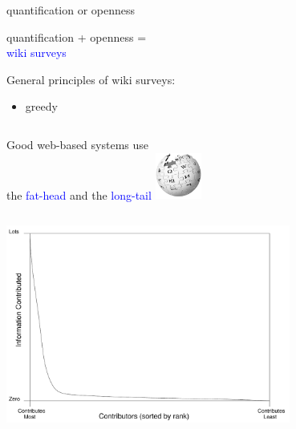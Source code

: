 \documentclass[aspectratio=169]{beamer}
\begin{document}
\begin{frame}

\begin{center}
{\LARGE quantification} or {\LARGE openness} 
\end{center}

\end{frame}
\begin{frame}

\begin{center}
{\LARGE quantification} + {\LARGE openness} =\\ \textcolor{blue}{\LARGE wiki surveys}
\end{center}

\end{frame}
\begin{frame}

General principles of wiki surveys:
\begin{itemize}
\item greedy
\end{itemize}

\end{frame}
\begin{frame}

\begin{columns}[c] 
\column{2.5in} 
\hspace{0.6in}Good web-based systems use\\ \hspace{0.6in}the \textcolor{blue}{fat-head} and the \textcolor{blue}{long-tail} 
\column{1in} 
\hspace{-0.3in}\includegraphics[width=0.6in]{figures/200px-Wikipedia-logo}
\end{columns} 

\begin{center}
\includegraphics[width=0.7\textwidth]{figures/zipf_plot}
\end{center}

\end{frame}
\end{document}
